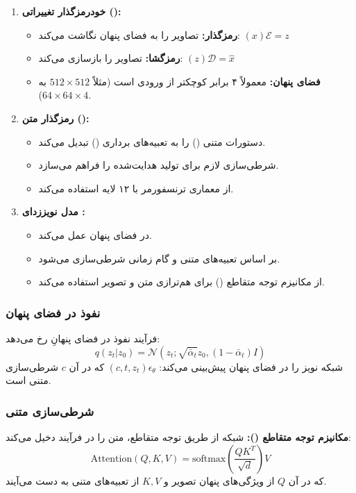 \begin{enumerate}
    \item \textbf{خودرمزگذار تغییراتی ():}
    \begin{itemize}
        \item \textbf{رمزگذار:} تصاویر را به فضای پنهان نگاشت می‌کند: $(x)\mathcal{E} = z$
        \item \textbf{رمزگشا:} تصاویر را بازسازی می‌کند: $(z)\mathcal{D} = \hat{x}$
        \item \textbf{فضای پنهان:} معمولاً ۴ برابر کوچکتر از ورودی است (مثلاً $512 \times 512$ به $64 \times 64 \times 4$).
    \end{itemize}

    \item \textbf{رمزگذار متن ():}
    \begin{itemize}
        \item دستورات متنی () را به تعبیه‌های برداری () تبدیل می‌کند.
        \item شرطی‌سازی لازم برای تولید هدایت‌شده را فراهم می‌سازد.
        \item از معماری ترنسفورمر با ۱۲ لایه استفاده می‌کند.
    \end{itemize}

    \item \textbf{مدل نویززدای :}
    \begin{itemize}
        \item در فضای پنهان عمل می‌کند.
        \item بر اساس تعبیه‌های متنی و گام زمانی شرطی‌سازی می‌شود.
        \item از مکانیزم توجه متقاطع () برای هم‌ترازی متن و تصویر استفاده می‌کند.
    \end{itemize}
\end{enumerate}

\subsubsection{نفوذ در فضای پنهان}
فرآیند نفوذ در فضای پنهانِ  رخ می‌دهد:
\[ q(z_t | z_0) = \mathcal{N}(z_t; \sqrt{\bar{\alpha}_t} z_0, (1-\bar{\alpha}_t) I) \]
شبکه  نویز را در فضای پنهان پیش‌بینی می‌کند: $(c, t, z_t)\epsilon_\theta$ که در آن $c$ شرطی‌سازی متنی است.

\subsubsection{شرطی‌سازی متنی}
\textbf{مکانیزم توجه متقاطع ():} شبکه  از طریق توجه متقاطع، متن را در فرآیند دخیل می‌کند:
\[ \text{Attention}(Q, K, V) = \text{softmax}\left(\frac{QK^T}{\sqrt{d}}\right) V \]
که در آن $Q$ از ویژگی‌های پنهان تصویر و $K, V$ از تعبیه‌های متنی به دست می‌آیند.



